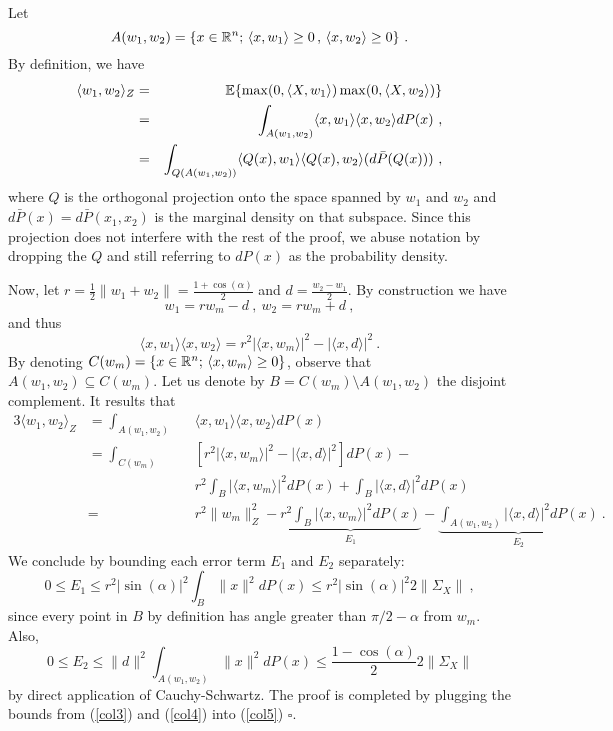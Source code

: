 Let 
$$A(w_1, w_2) = \{ x \in {\mathbb{R}}^n; \, \langle x, w_1 \rangle \geq 0\,,\, \langle x, w_2 \rangle \geq 0\}~.$$
By definition, we have 
\begin{eqnarray}
\label{col1}
\langle w_1, w_2 \rangle_Z &=& {\mathbb{E}} \{ \max(0, \langle X, w_1 \rangle ) \max(0, \langle X, w_2 \rangle ) \} \\
&=& \int_{A(w_1, w_2)} \langle x, w_1 \rangle  \langle x, w_2 \rangle dP(x)~, \\
&=& \int_{Q({A}(w_1, w_2))}  \langle Q(x), w_1 \rangle  \langle Q(x), w_2 \rangle (d\bar{P}(Q(x)))~,  
\end{eqnarray}
where $Q$ is the orthogonal projection onto the space spanned by $w_1$ and $w_2$ and
 $d\bar{P}(x)=d\bar{P}(x_1, x_2)$ is the marginal density on that subspace. 
 Since this projection does not interfere with the rest of the proof, we abuse notation by dropping the $Q$ and still referring to $dP(x)$ as the probability density.

Now, let $r = \frac{1}{2}\| w_1 + w_2 \| = \frac{1 + \cos(\alpha)}{2}$ and $d = \frac{w_2 - w_1}{2}$.
By construction we have 
$$w_1 = r w_m - d~,~ w_2 = r w_m + d~,$$
and thus 
\begin{equation}
\label{col2}
\langle x, w_1 \rangle  \langle x, w_2 \rangle = r^2 | \langle x, w_m \rangle |^2 - | \langle x, d \rangle |^2~.
\end{equation}
By denoting $C(w_m) = \{ x \in {\mathbb{R}}^n;\, \langle x, w_m \rangle \geq 0 \}$, 
observe that $A(w_1, w_2 ) \subseteq C(w_m)$. Let us denote by $B = C(w_m) \setminus A(w_1, w_2) $ the disjoint complement. It results that 
\begin{alignat}{3}
\label{col5}
\langle w_1, w_2 \rangle_Z &= \int_{A(w_1, w_2)} &&\langle x, w_1 \rangle  \langle x, w_2 \rangle dP(x) \nonumber \\
&= \int_{C(w_m)} &&[r^2 | \langle x, w_m \rangle |^2 - | \langle x, d \rangle |^2 ] dP(x) - \nonumber \\
& &&r^2 \int_B  | \langle x, w_m \rangle |^2 dP(x) + \int_B  | \langle x, d \rangle |^2  dP(x) \nonumber \\ 
&= &&r^2 \| w_m \|_Z^2 - \underbrace{ r^2 \int_B  | \langle x, w_m \rangle |^2 dP(x)}_{E_1} - \underbrace{\int_{A(w_1, w_2)} | \langle x, d \rangle |^2  dP(x) }_{E_2}~.
\end{alignat} 
We conclude by bounding each error term $E_1$ and $E_2$ separately:
\begin{equation}
\label{col3}
0 \leq E_1 \leq r^2 |\sin(\alpha)|^2 \int_B \| x \|^2 dP(x) \leq r^2 |\sin(\alpha)|^2 2 \| \Sigma_X\|~,
\end{equation}
since every point in $B$ by definition has angle greater than $\pi/2 - \alpha$ from $w_m$. Also,
\begin{equation}
\label{col4}
0 \leq E_2 \leq \|d \|^2 \int_{A(w_1, w_2)} \| x \|^2 dP(x) \leq \frac{1 - \cos(\alpha)}{2} 2 \| \Sigma_X \|
\end{equation}
by direct application of Cauchy-Schwartz. The proof is completed by plugging the bounds from (\ref{col3}) and (\ref{col4}) into (\ref{col5})  $\square$.


